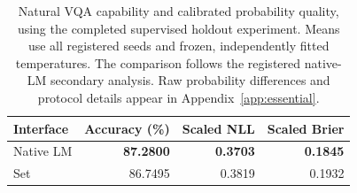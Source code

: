 \begin{table}[htbp]
\centering\small
\begin{tabular}{lrrr}
\toprule
Interface & Accuracy (\%) & Scaled NLL & Scaled Brier \\
\midrule
Native LM & \textbf{87.2800} & \textbf{0.3703} & \textbf{0.1845} \\
Set & 86.7495 & 0.3819 & 0.1932 \\
\bottomrule
\end{tabular}
\caption{Natural VQA capability and calibrated probability quality, using the completed supervised holdout experiment. Means use all registered seeds and frozen, independently fitted temperatures. The comparison follows the registered native-LM secondary analysis. Raw probability differences and protocol details appear in Appendix~\ref{app:essential}.}
\label{tab:vqa-native-summary}
\end{table}
